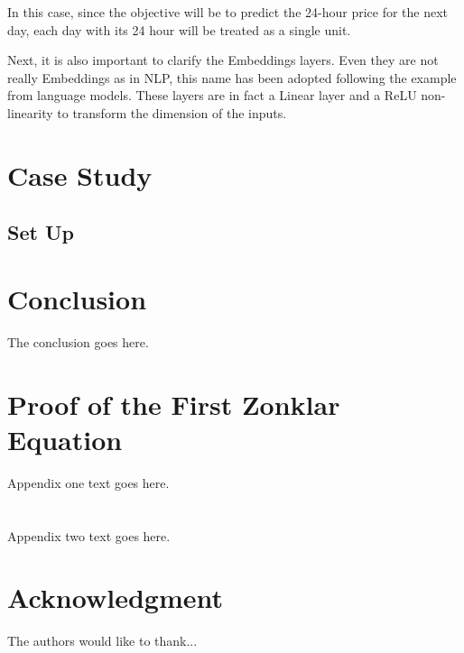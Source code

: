 \documentclass[journal]{IEEEtran}
\begin{document}
In this case, since the objective will be to predict the 24-hour price for the next day, each day with its 24 hour will be treated as a single unit.

Next, it is also important to clarify the Embeddings layers. Even they are not really Embeddings as in NLP, this name has been adopted following the example from language models. These layers are in fact a Linear layer and a ReLU non-linearity to transform the dimension of the inputs.


\section{Case Study}

\subsection{Set Up}


\section{Conclusion}
The conclusion goes here.


\appendices
\section{Proof of the First Zonklar Equation}
Appendix one text goes here.

\section{}
Appendix two text goes here.


\section*{Acknowledgment}


The authors would like to thank...


\ifCLASSOPTIONcaptionsoff
  \newpage
\fi







\end{document}
